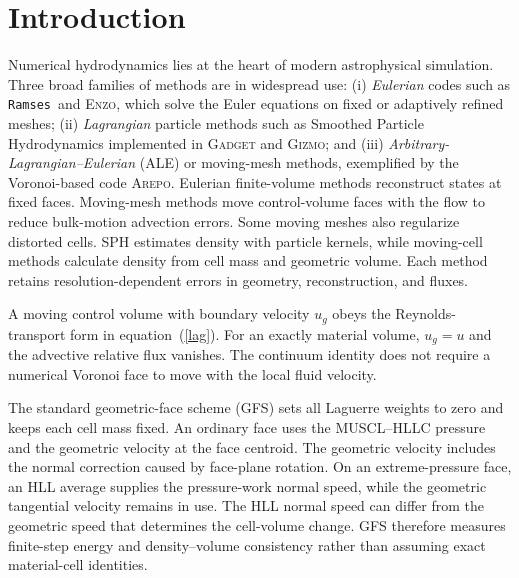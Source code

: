 \documentclass[twocolumn]{aastex63}
\newcommand{\ramses}{{\texttt{Ramses}}}
\newcommand{\vel}{{u}}
\begin{document}




\section{Introduction}\label{sec:in}

Numerical hydrodynamics lies at the heart of modern
astrophysical simulation.
Three broad families of methods are in widespread use:
(i) \emph{Eulerian} codes such as \ramses\ and \textsc{Enzo},
which solve the Euler equations on fixed or adaptively refined meshes;
(ii) \emph{Lagrangian} particle methods such as Smoothed Particle
Hydrodynamics \citep[SPH;][]{Lucy1977,GingoldMonaghan1977}
implemented in \textsc{Gadget} and \textsc{Gizmo}; and
(iii) \emph{Arbitrary-Lagrangian--Eulerian} (ALE) or moving-mesh
methods, exemplified by the Voronoi-based code \textsc{Arepo}.
Eulerian finite-volume methods reconstruct states at fixed faces. Moving-mesh
methods move control-volume faces with the flow to reduce bulk-motion
advection errors. Some moving meshes also regularize distorted cells.
SPH estimates density with particle kernels, while moving-cell methods
calculate density from cell mass and geometric volume. Each method retains
resolution-dependent errors in geometry, reconstruction, and fluxes.

A moving control volume with boundary velocity $\vel_g$ obeys the
Reynolds-transport form in equation~(\ref{lag}). For an exactly material
volume, $\vel_g=\vel$ and the advective relative flux vanishes. The continuum
identity does not require a numerical Voronoi face to move with the local
fluid velocity.

The standard geometric-face scheme (GFS) sets all Laguerre weights to zero
and keeps each cell mass fixed. An ordinary face uses the MUSCL--HLLC
pressure and the geometric velocity at the face centroid. The geometric
velocity includes the normal correction caused by face-plane rotation. On an
extreme-pressure face, an HLL average supplies the pressure-work normal speed,
while the geometric tangential velocity remains in use. The HLL normal speed
can differ from the geometric speed that determines the cell-volume change.
GFS therefore measures finite-step energy and density--volume consistency
rather than assuming exact material-cell identities.
\end{document}

